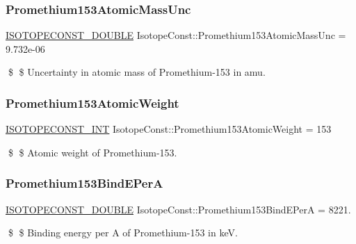 \subsubsection{\texorpdfstring{Promethium153\+Atomic\+Mass\+Unc}{Promethium153AtomicMassUnc}}
{\footnotesize\ttfamily \mbox{\hyperlink{group___isotope_const-_macros_ga8f45a7272ce02c0b4c65c44636ed719a}{I\+S\+O\+T\+O\+P\+E\+C\+O\+N\+S\+T\+\_\+\+D\+O\+U\+B\+LE}} Isotope\+Const\+::\+Promethium153\+Atomic\+Mass\+Unc = 9.\+732e-\/06}

\$ \$ Uncertainty in atomic mass of Promethium-\/153 in amu. \mbox{\label{group___isotope_const-_promethium-_pm153_ga35703e0ea6e2e5a612bd7a9810e7461f}} 
\subsubsection{\texorpdfstring{Promethium153\+Atomic\+Weight}{Promethium153AtomicWeight}}
{\footnotesize\ttfamily \mbox{\hyperlink{group___isotope_const-_macros_ga5f18360b3e99483a35c32d789e62621c}{I\+S\+O\+T\+O\+P\+E\+C\+O\+N\+S\+T\+\_\+\+I\+NT}} Isotope\+Const\+::\+Promethium153\+Atomic\+Weight = 153}

\$ \$ Atomic weight of Promethium-\/153. \mbox{\label{group___isotope_const-_promethium-_pm153_ga8227b4a061e8ec3955933fc238d8a99f}} 
\subsubsection{\texorpdfstring{Promethium153\+Bind\+E\+PerA}{Promethium153BindEPerA}}
{\footnotesize\ttfamily \mbox{\hyperlink{group___isotope_const-_macros_ga8f45a7272ce02c0b4c65c44636ed719a}{I\+S\+O\+T\+O\+P\+E\+C\+O\+N\+S\+T\+\_\+\+D\+O\+U\+B\+LE}} Isotope\+Const\+::\+Promethium153\+Bind\+E\+PerA = 8221.}

\$ \$ Binding energy per A of Promethium-\/153 in keV. \mbox{\label{group___isotope_const-_promethium-_pm153_gaaecfcae06002b7ea1de392249bcc7e64}} 
